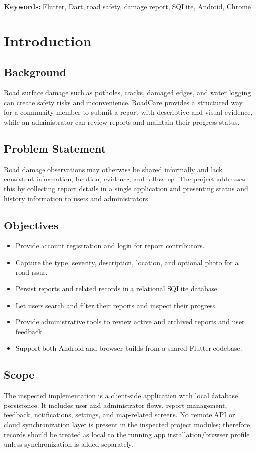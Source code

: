 \documentclass[12pt,a4paper]{report}
\begin{document}
\noindent\textbf{Keywords:} Flutter, Dart, road safety, damage report, SQLite, Android, Chrome

\tableofcontents
\listoftables
\clearpage
{}

\chapter{Introduction}
\section{Background}
Road surface damage such as potholes, cracks, damaged edges, and water logging can create safety risks and inconvenience. RoadCare provides a structured way for a community member to submit a report with descriptive and visual evidence, while an administrator can review reports and maintain their progress status.

\section{Problem Statement}
Road damage observations may otherwise be shared informally and lack consistent information, location, evidence, and follow-up. The project addresses this by collecting report details in a single application and presenting status and history information to users and administrators.

\section{Objectives}
\begin{itemize}
  \item Provide account registration and login for report contributors.
  \item Capture the type, severity, description, location, and optional photo for a road issue.
  \item Persist reports and related records in a relational SQLite database.
  \item Let users search and filter their reports and inspect their progress.
  \item Provide administrative tools to review active and archived reports and user feedback.
  \item Support both Android and browser builds from a shared Flutter codebase.
\end{itemize}

\section{Scope}
The inspected implementation is a client-side application with local database persistence. It includes user and administrator flows, report management, feedback, notifications, settings, and map-related screens. No remote API or cloud synchronization layer is present in the inspected project modules; therefore, records should be treated as local to the running app installation/browser profile unless synchronization is added separately.
\end{document}
